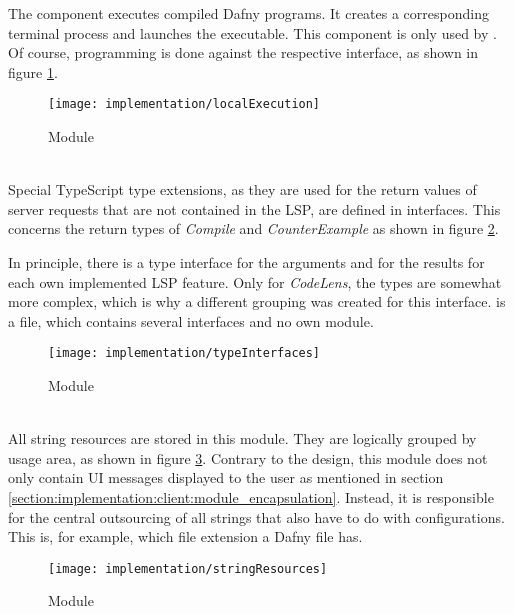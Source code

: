 The component  executes compiled Dafny programs.
It creates a corresponding terminal process and launches the executable.
This component is only used by .
Of course, programming is done against the respective interface, as shown in figure \ref{fig:localExecution}.

\begin{figure}[H]
    \centering
    \texttt{[image: implementation/localExecution]}
    \caption{Module }
    \label{fig:localExecution}
\end{figure}

\textbf{}\\
Special TypeScript type extensions,
as they are used for the return values of server requests
that are not contained in the LSP, are defined in interfaces.
This concerns the return types of \textit{Compile} and \textit{CounterExample} as shown in figure \ref{fig:typeInterfaces}.

In principle, there is a type interface for the arguments and for the results for each own implemented LSP feature.
Only for \textit{CodeLens}, the types are somewhat more complex, which is why a different grouping was created for this interface.
 is a file, which contains several interfaces and no own module.

\begin{figure}[H]
    \centering
    \texttt{[image: implementation/typeInterfaces]}
    \caption{Module }
    \label{fig:typeInterfaces}
\end{figure}

\textbf{}\\
All string resources are stored in this module.
They are logically grouped by usage area, as shown in figure \ref{fig:stringResources}.
Contrary to the design, this module does not only contain UI messages displayed to the user as mentioned in section 
\ref{section:implementation:client:module_encapsulation}.
Instead, it is responsible for the central outsourcing of all strings that also have to do with configurations.
This is, for example, which file extension a Dafny file has.

\begin{figure}[H]
    \centering
    \texttt{[image: implementation/stringResources]}
    \caption{Module }
    \label{fig:stringResources}
\end{figure}


